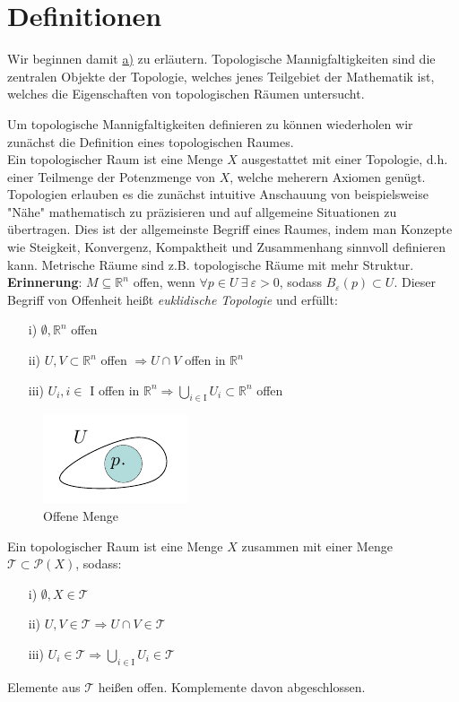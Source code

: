 \section{Definitionen}
Wir beginnen damit \hyperref[item:frage1]{a)} zu erläutern.
Topologische Mannigfaltigkeiten sind die zentralen Objekte der Topologie, welches jenes Teilgebiet der Mathematik ist, welches die Eigenschaften von topologischen Räumen untersucht.

Um topologische Mannigfaltigkeiten definieren zu können wiederholen wir zunächst die Definition eines topologischen Raumes. \\
Ein topologischer Raum ist eine Menge $X$ ausgestattet mit einer Topologie, d.h. einer Teilmenge der Potenzmenge von $X$, welche meherern Axiomen genügt.
Topologien erlauben es die zunächst intuitive Anschauung von beispielsweise "Nähe" mathematisch zu präzisieren und auf allgemeine Situationen zu übertragen.
Dies ist der allgemeinste Begriff eines Raumes, indem man Konzepte wie Steigkeit, Konvergenz, Kompaktheit und Zusammenhang sinnvoll definieren kann. 
Metrische Räume sind z.B. topologische Räume mit mehr Struktur.
\phantom{.}\\
\textbf{Erinnerung}: $M \subseteq \mathbb{R}^n$ offen, wenn $\forall p \in U \ \exists \ \varepsilon>0$, sodass $B_{\varepsilon}(p) \subset U$. Dieser Begriff von Offenheit heißt \textit{euklidische Topologie} und erfüllt:
\begin{enumerate}
\item[i)] $\emptyset, \mathbb{R}^n$ offen
\item[ii)] $U, V \subset \mathbb{R}^n$ offen $\Rightarrow U \cap V$ offen in $\mathbb{R}^n$
\item [iii)] $U_i, i \in $ I offen in $\mathbb{R}^n \Rightarrow \bigcup\limits_{i \in \text{I}} U_i \subset \mathbb{R}^n$ offen
\end{enumerate} 

\begin{figure}[H]
\centering
\includegraphics[scale=1.5]{figures/tikz/openset.pdf}
\caption{Offene Menge}
\label{img:offenemenge}
\end{figure} 

\begin{defs}
Ein topologischer Raum ist eine Menge $X$ zusammen mit einer Menge $\mathcal{T} \subset \mathcal{P}(X)$, sodass:
\begin{enumerate}
\item[i)] $\emptyset, X \in \mathcal{T}$
\item[ii)] $U, V \in \mathcal{T} \Rightarrow  U \cap V \in \mathcal{T}$
\item [iii)] $U_i \in \mathcal{T} \Rightarrow\bigcup\limits_{i \in \text{I}} U_i \in \mathcal{T}$
\end{enumerate} 
Elemente aus $\mathcal{T}$ heißen offen. 
Komplemente davon abgeschlossen.
\end{defs}

